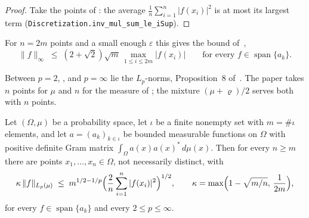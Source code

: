 \begin{proof}
\leanok
{}
Take the points of : the average
$\frac{1}{n} \sum_{i=1}^n |f(x_i)|^2$ is at most its largest term
(\texttt{Discretization.inv\_mul\_sum\_le\_iSup}).
\end{proof}

For $n = 2m$ points and a small enough $\varepsilon$ this gives the bound of~\cite{CDKU},
\[
  \|f\|_\infty \; \leq \; (2 + \sqrt{2}) \sqrt{m} \, \max_{1 \leq i \leq 2m} |f(x_i)|
  \qquad \text{for every } f \in \operatorname{span}\{a_k\}.
\]

Between $p = 2$, , and $p = \infty$ lie the $L_p$-norms,
Proposition~8 of~\cite{CDKU}. The paper takes $n$ points for $\mu$ and $n$ for the measure of
; the mixture $(\mu + \varrho)/2$ serves both with $n$
points.

\begin{corollary}
\label{cor:lp-discretization}
\leanok
Let $(\Omega, \mu)$ be a probability space, let $\iota$ be a finite nonempty set with
$m = \#\iota$ elements, and let $a = (a_k)_{k \in \iota}$ be bounded measurable functions on
$\Omega$ with positive definite Gram matrix $\int_\Omega a(x) a(x)^* \, d\mu(x)$. Then for
every $n \geq m$ there are points $x_1, \dots, x_n \in \Omega$, not necessarily distinct, with
\[
  \kappa \, \|f\|_{L_p(\mu)}
  \;\leq\; m^{1/2 - 1/p} \Bigl( \frac{2}{n} \sum_{i=1}^n |f(x_i)|^2 \Bigr)^{1/2},
  \qquad \kappa = \max\Bigl( 1 - \sqrt{m/n}, \, \frac{1}{2m} \Bigr),
\]
for every $f \in \operatorname{span}\{a_k\}$ and every $2 \leq p \leq \infty$.
\end{corollary}

